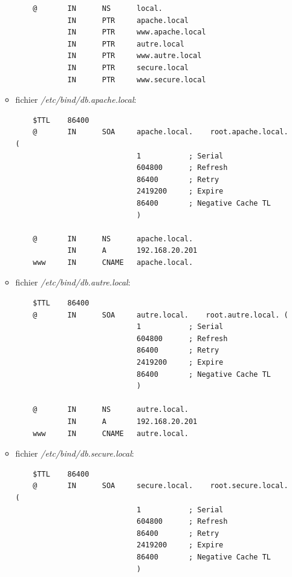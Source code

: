 \documentclass[a4paper]{article}
\begin{document}
\begin{itemize}
\begin{example}
\begin{itemize}
\begin{verbatim}
    @       IN      NS      local.
            IN      PTR     apache.local
            IN      PTR     www.apache.local
            IN      PTR     autre.local
            IN      PTR     www.autre.local
            IN      PTR     secure.local
            IN      PTR     www.secure.local
        \end{verbatim}
        \item fichier \textit{/etc/bind/db.apache.local}:
        \begin{verbatim}
    $TTL    86400
    @       IN      SOA     apache.local.    root.apache.local. (
                            1           ; Serial
                            604800      ; Refresh
                            86400       ; Retry
                            2419200     ; Expire
                            86400       ; Negative Cache TL
                            )

    @       IN      NS      apache.local.
            IN      A       192.168.20.201
    www     IN      CNAME   apache.local.
        \end{verbatim}
        \item fichier \textit{/etc/bind/db.autre.local}:
        \begin{verbatim}
    $TTL    86400
    @       IN      SOA     autre.local.    root.autre.local. (
                            1           ; Serial
                            604800      ; Refresh
                            86400       ; Retry
                            2419200     ; Expire
                            86400       ; Negative Cache TL
                            )

    @       IN      NS      autre.local.
            IN      A       192.168.20.201
    www     IN      CNAME   autre.local.
        \end{verbatim}
        \item fichier \textit{/etc/bind/db.secure.local}:
        \begin{verbatim}
    $TTL    86400
    @       IN      SOA     secure.local.    root.secure.local. (
                            1           ; Serial
                            604800      ; Refresh
                            86400       ; Retry
                            2419200     ; Expire
                            86400       ; Negative Cache TL
                            )


\end{verbatim}
\end{itemize}
\end{example}
\end{itemize}
\end{document}
